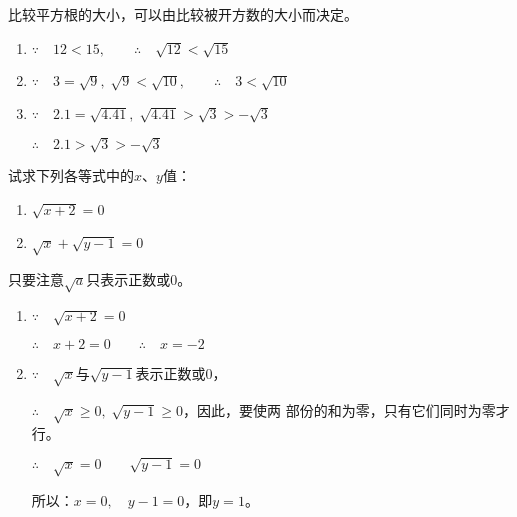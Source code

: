 \begin{solution}
    比较平方根的大小，可以由比较被开方数的大小而决定。
\begin{enumerate}
    \item $\because\quad 12<15,\qquad \therefore\quad \sqrt{12}<\sqrt{15}$
    \item  $\because\quad 3=\sqrt{9},\; \sqrt{9}<\sqrt{10},\qquad \therefore\quad 3<\sqrt{10}$
    \item  $\because\quad 2.1=\sqrt{4.41},\;\sqrt{4.41}>\sqrt{3}>-\sqrt{3}$
    
    $\therefore\quad 2.1>\sqrt{3}>-\sqrt{3}$
\end{enumerate}

\end{solution}




\begin{example}
    试求下列各等式中的$x$、$y$值：
    \begin{enumerate}
        \item $\sqrt{x+2}=0$
        \item $\sqrt{x}+\sqrt{y-1}=0$
    \end{enumerate}
\end{example}


\begin{solution}
只要注意$\sqrt{a}$只表示正数或0。
\begin{enumerate}
    \item $\because\quad \sqrt{x+2}=0$
    
    $\therefore\quad x+2=0\qquad \therefore\quad x=-2$  
    \item $\because\quad \sqrt{x}$与$\sqrt{y-1}$表示正数或0，
    
    $\therefore\quad \sqrt{x}\ge 0, \; \sqrt{y-1}\ge 0$，因此，要使两
    部份的和为零，只有它们同时为零才行。

    $\therefore\quad\sqrt{x}=0\qquad \sqrt{y-1}=0$

    所以：$x=0,\quad y-1=0$，即$y=1$。
\end{enumerate}
\end{solution}

